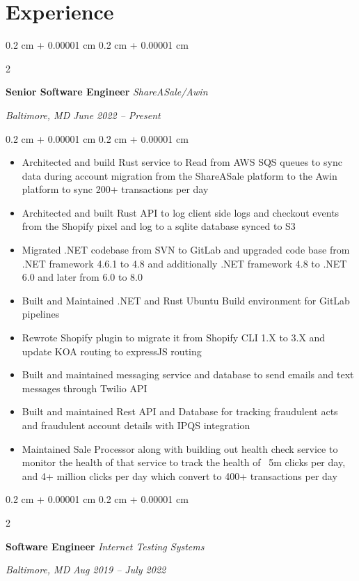 \documentclass[10pt, letterpaper]{article}
\newenvironment{highlights}{
    \begin{itemize}[
        topsep=0.10 cm,
        parsep=0.10 cm,
        partopsep=0pt,
        itemsep=0pt,
        leftmargin=0.4 cm + 10pt
        ]
    }{
\end{itemize}
} %
\newenvironment{onecolentry}{
    \begin{adjustwidth}{
            0.2 cm + 0.00001 cm
        }{
            0.2 cm + 0.00001 cm
        }
    }{
    \end{adjustwidth}
} %
\newenvironment{twocolentry}[2][]{
    \onecolentry
    \def\secondColumn{#2}
    \setcolumnwidth{\fill, 4.5 cm}
    \begin{paracol}{2}
    }{
        \switchcolumn \raggedleft \secondColumn
    \end{paracol}
    \endonecolentry
} %
\begin{document}
\section{Experience}
\begin{twocolentry}{
    \textit{Baltimore, MD}
    \textit{June 2022 – Present}}
    \textbf{Senior Software Engineer}
    \textit{ShareASale/Awin}
\end{twocolentry}
\begin{onecolentry}
    \begin{highlights}
        \item Architected and build Rust service to Read  from AWS SQS queues to sync data during account migration from the ShareASale platform to the Awin platform to sync 200+ transactions per day
        \item Architected and built Rust API to log client side logs and checkout events from the Shopify pixel and log to a sqlite database synced to S3
        \item Migrated .NET codebase from SVN to GitLab and upgraded code base from .NET framework 4.6.1 to 4.8 and additionally .NET framework 4.8 to .NET 6.0 and later from 6.0 to 8.0
        \item Built and Maintained .NET and Rust Ubuntu Build environment for GitLab pipelines
        \item Rewrote Shopify plugin to migrate it from Shopify CLI 1.X to 3.X and update KOA routing to expressJS routing
        \item Built and maintained messaging service and database to send emails and text messages through Twilio API
        \item Built and maintained Rest API and Database for tracking fraudulent acts and fraudulent account details with IPQS integration
        \item Maintained Sale Processor along with building out health check service to monitor the health of that service to track the health of ~5m clicks per day, and 4+ million clicks per day which convert to 400+ transactions per day
        \end{highlights}
    \end{onecolentry}
    \vspace{0.2 cm}
    \begin{twocolentry}{
            \textit{Baltimore, MD}
        \textit{Aug 2019 – July 2022}}
        \textbf{Software Engineer}
        \textit{Internet Testing Systems}
    \end{twocolentry}
    \vspace{0.10 cm}
\end{document}

